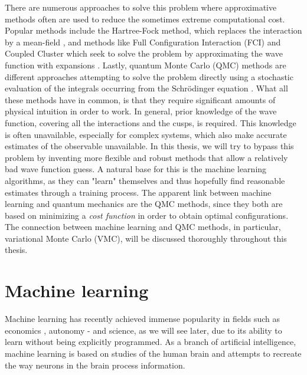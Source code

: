 There are numerous approaches to solve this problem where approximative methods often are used to reduce the sometimes extreme computational cost. Popular methods include the Hartree-Fock method, which replaces the interaction by a mean-field \cite{hartree_wave_1928, fock_selfconsistent_1930}, and methods like Full Configuration Interaction (FCI) and Coupled Cluster which seek to solve the problem by approximating the wave function with expansions \cite{daniel_crawford_introduction_2007}. Lastly, quantum Monte Carlo (QMC) methods are different approaches attempting to solve the problem directly using a stochastic evaluation of the integrals occurring from the Schrödinger equation \cite{bajdich_electronic_2010}. What all these methods have in common, is that they require significant amounts of physical intuition in order to work. In general, prior knowledge of the wave function, covering all the interactions and the cusps, is required. This knowledge is often unavailable, especially for complex systems, which also make accurate estimates of the observable unavailable. In this thesis, we will try to bypass this problem by inventing more flexible and robust methods that allow a relatively bad wave function guess. A natural base for this is the machine learning algorithms, as they can "learn" themselves and thus hopefully find reasonable estimates through a training process. The apparent link between machine learning and quantum mechanics are the QMC methods, since they both are based on minimizing a \textit{cost function} in order to obtain optimal configurations. The connection between machine learning and QMC methods, in particular, variational Monte Carlo (VMC), will be discussed thoroughly throughout this thesis.

\section{Machine learning} \label{sec:machinelearning}
Machine learning has recently achieved immense popularity in fields such as economics \cite{dube_scalable_2017}, autonomy \cite{chernova_interactive_2009} - and science, as we will see later, due to its ability to learn without being explicitly programmed. As a branch of artificial intelligence, machine learning is based on studies of the human brain and attempts to recreate the way neurons in the brain process information.

